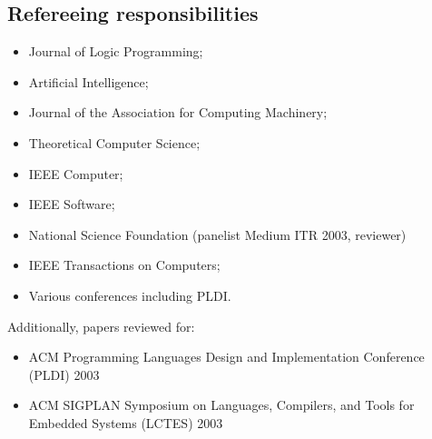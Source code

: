 \documentclass{article}
\begin{document}
\subsection*{Refereeing responsibilities}
\begin{itemize}
\item  Journal of Logic Programming; 
\item  Artificial Intelligence; 
\item  Journal of the Association for Computing Machinery; 
\item  Theoretical Computer Science; 
\item  IEEE Computer;
\item  IEEE Software;
\item National Science Foundation (panelist Medium ITR 2003, reviewer)
\item IEEE Transactions on Computers;
\item  Various conferences including PLDI.
\end{itemize}

Additionally, papers reviewed for:
\begin{itemize}
\item ACM Programming Languages Design and Implementation Conference
(PLDI) 2003

\item ACM SIGPLAN Symposium on Languages, Compilers, and Tools for
Embedded Systems (LCTES) 2003
\end{itemize}
\end{document}
